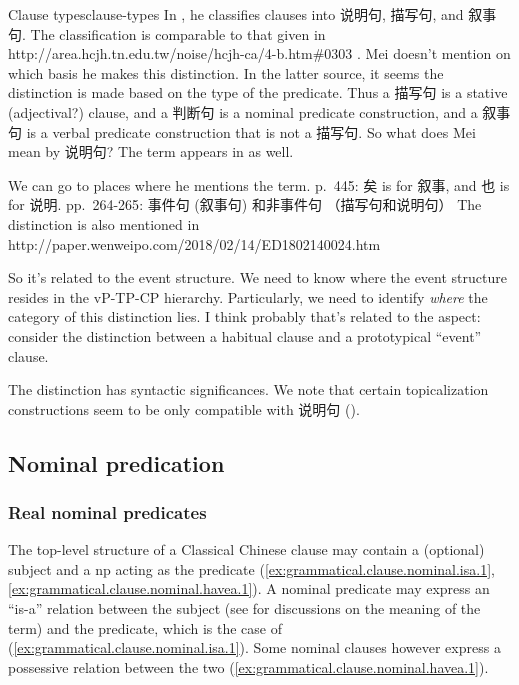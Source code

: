 \documentclass[UTF8, a4paper, oneside, scheme=plain, 12pt]{ctexrep}
\newcommand*{\citepage}[1]{p.~{#1}}
\newcommand*{\citepages}[1]{pp.~{#1}}
\begin{document}
\begin{todobox}{Clause types}{clause-types}
    In \citet[\citepage{131}]{meiguang2018},
    he classifies clauses into 说明句, 描写句, and 叙事句.
    The classification is comparable to that given in  http://area.hcjh.tn.edu.tw/noise/hcjh-ca/4-b.htm\#0303 .
    Mei doesn't mention on which basis he makes this distinction.
    In the latter source, it seems the distinction is made based on the type of the predicate.
    Thus a 描写句 is a stative (adjectival?) clause,
    and a 判断句 is a nominal predicate construction,
    and a 叙事句 is a verbal predicate construction that is not a 描写句.
    So what does Mei mean by 说明句?
    The term appears in \citet{li2004grammar} as well.


    We can go to places where he mentions the term.
    \citepage{445}: 矣 is for 叙事, and 也 is for 说明.
    \citepages{264-265}: 事件句 (叙事句) 和非事件句 （描写句和说明句）
    The distinction is also mentioned in http://paper.wenweipo.com/2018/02/14/ED1802140024.htm
    
    So it's related to the event structure.
    We need to know where the event structure resides in the vP-TP-CP hierarchy.
    Particularly, we need to identify \emph{where} the category of this distinction lies.
    I think probably that's related to the aspect:
    consider the distinction between a habitual clause and a prototypical ``event'' clause.
    
    The distinction has syntactic significances.
    We note that certain topicalization constructions seem to be only compatible with 说明句
    ().
\end{todobox}

\subsection{Nominal predication}\label{sec:grammatical.clause.nominal}

\subsubsection{Real nominal predicates}\label{sec:grammatical.clause.nominal.real}

The top-level structure of a Classical Chinese clause may contain 
a (optional) subject and a \ac{np} acting as the predicate
(\ref{ex:grammatical.clause.nominal.isa.1},
\ref{ex:grammatical.clause.nominal.havea.1}).
A nominal predicate may express an ``is-a'' relation between the subject (see  for discussions on the meaning of the term) and the predicate,
which is the case of (\ref{ex:grammatical.clause.nominal.isa.1}).
Some nominal clauses however express a possessive relation between the two 
(\ref{ex:grammatical.clause.nominal.havea.1}).
\end{document}
